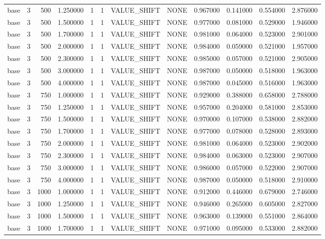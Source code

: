 \begin{tabular}{lrrrllllrrrr}
base & 3 & 500 & 1.250000 & 1 & 1 & VALUE_SHIFT & NONE & 0.967000 & 0.141000 & 0.554000 & 2.876000 \\
base & 3 & 500 & 1.500000 & 1 & 1 & VALUE_SHIFT & NONE & 0.977000 & 0.081000 & 0.529000 & 1.946000 \\
base & 3 & 500 & 1.700000 & 1 & 1 & VALUE_SHIFT & NONE & 0.981000 & 0.064000 & 0.523000 & 2.901000 \\
base & 3 & 500 & 2.000000 & 1 & 1 & VALUE_SHIFT & NONE & 0.984000 & 0.059000 & 0.521000 & 1.957000 \\
base & 3 & 500 & 2.300000 & 1 & 1 & VALUE_SHIFT & NONE & 0.985000 & 0.057000 & 0.521000 & 2.905000 \\
base & 3 & 500 & 3.000000 & 1 & 1 & VALUE_SHIFT & NONE & 0.987000 & 0.050000 & 0.518000 & 1.963000 \\
base & 3 & 500 & 4.000000 & 1 & 1 & VALUE_SHIFT & NONE & 0.987000 & 0.045000 & 0.516000 & 1.963000 \\
base & 3 & 750 & 1.000000 & 1 & 1 & VALUE_SHIFT & NONE & 0.929000 & 0.388000 & 0.658000 & 2.788000 \\
base & 3 & 750 & 1.250000 & 1 & 1 & VALUE_SHIFT & NONE & 0.957000 & 0.204000 & 0.581000 & 2.853000 \\
base & 3 & 750 & 1.500000 & 1 & 1 & VALUE_SHIFT & NONE & 0.970000 & 0.107000 & 0.538000 & 2.882000 \\
base & 3 & 750 & 1.700000 & 1 & 1 & VALUE_SHIFT & NONE & 0.977000 & 0.078000 & 0.528000 & 2.893000 \\
base & 3 & 750 & 2.000000 & 1 & 1 & VALUE_SHIFT & NONE & 0.981000 & 0.064000 & 0.523000 & 2.902000 \\
base & 3 & 750 & 2.300000 & 1 & 1 & VALUE_SHIFT & NONE & 0.984000 & 0.063000 & 0.523000 & 2.907000 \\
base & 3 & 750 & 3.000000 & 1 & 1 & VALUE_SHIFT & NONE & 0.986000 & 0.057000 & 0.522000 & 2.907000 \\
base & 3 & 750 & 4.000000 & 1 & 1 & VALUE_SHIFT & NONE & 0.987000 & 0.050000 & 0.518000 & 2.910000 \\
base & 3 & 1000 & 1.000000 & 1 & 1 & VALUE_SHIFT & NONE & 0.912000 & 0.446000 & 0.679000 & 2.746000 \\
base & 3 & 1000 & 1.250000 & 1 & 1 & VALUE_SHIFT & NONE & 0.946000 & 0.265000 & 0.605000 & 2.827000 \\
base & 3 & 1000 & 1.500000 & 1 & 1 & VALUE_SHIFT & NONE & 0.963000 & 0.139000 & 0.551000 & 2.864000 \\
base & 3 & 1000 & 1.700000 & 1 & 1 & VALUE_SHIFT & NONE & 0.971000 & 0.095000 & 0.533000 & 2.882000 \\

\end{tabular}
